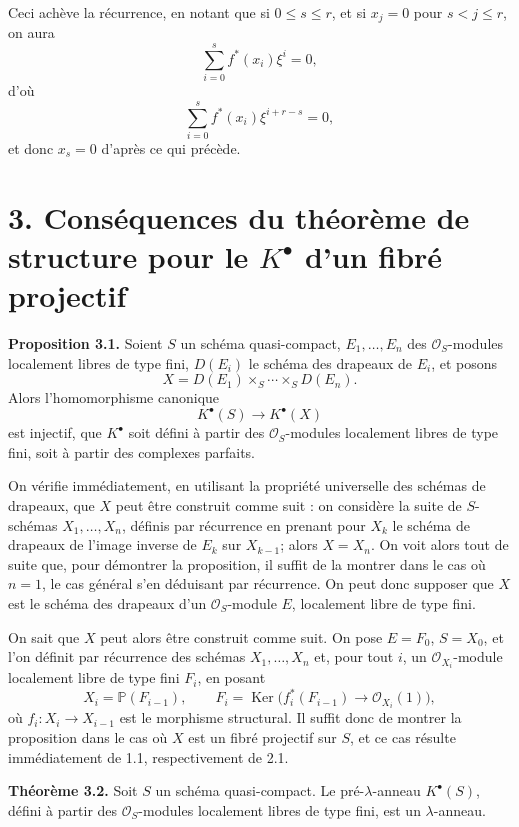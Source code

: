 \documentclass[11pt]{article}
\providecommand{\Ker}{\operatorname{Ker}}
\begin{document}
Ceci achève la récurrence, en notant que si \(0\le s\le r\), et si \(x_j=0\) pour \(s<j\le r\), on aura
\[
  \sum_{i=0}^{s} f^*(x_i)\xi^i=0,
\]
d'où
\[
  \sum_{i=0}^{s} f^*(x_i)\xi^{i+r-s}=0,
\]
et donc \(x_s=0\) d'après ce qui précède.

\section*{3. Conséquences du théorème de structure pour le \(K^\bullet\) d'un fibré projectif}

\textbf{Proposition 3.1.} Soient \(S\) un schéma quasi-compact, \(E_1,\ldots,E_n\) des \(\mathcal O_S\)-modules localement libres de type fini, \(D(E_i)\) le schéma des drapeaux de \(E_i\), et posons
\[
  X=D(E_1)\times_S\cdots\times_S D(E_n).
\]
Alors l'homomorphisme canonique
\[
  K^\bullet(S)\longrightarrow K^\bullet(X)
\]
est injectif, que \(K^\bullet\) soit défini à partir des \(\mathcal O_S\)-modules localement libres de type fini, soit à partir des complexes parfaits.

On vérifie immédiatement, en utilisant la propriété universelle des schémas de drapeaux, que \(X\) peut être construit comme suit : on considère la suite de \(S\)-schémas \(X_1,\ldots,X_n\), définis par récurrence en prenant pour \(X_k\) le schéma de drapeaux de l'image inverse de \(E_k\) sur \(X_{k-1}\); alors \(X=X_n\). On voit alors tout de suite que, pour démontrer la proposition, il suffit de la montrer dans le cas où \(n=1\), le cas général s'en déduisant par récurrence. On peut donc supposer que \(X\) est le schéma des drapeaux d'un \(\mathcal O_S\)-module \(E\), localement libre de type fini.

On sait que \(X\) peut alors être construit comme suit. On pose \(E=F_0\), \(S=X_0\), et l'on définit par récurrence des schémas \(X_1,\ldots,X_n\) et, pour tout \(i\), un \(\mathcal O_{X_i}\)-module localement libre de type fini \(F_i\), en posant
\[
  X_i=\mathbb P(F_{i-1}),\qquad
  F_i=\Ker\bigl(f_i^*(F_{i-1})\longrightarrow \mathcal O_{X_i}(1)\bigr),
\]
où \(f_i:X_i\to X_{i-1}\) est le morphisme structural. Il suffit donc de montrer la proposition dans le cas où \(X\) est un fibré projectif sur \(S\), et ce cas résulte immédiatement de 1.1, respectivement de 2.1.

\textbf{Théorème 3.2.} Soit \(S\) un schéma quasi-compact. Le pré-\(\lambda\)-anneau \(K^\bullet(S)\), défini à partir des \(\mathcal O_S\)-modules localement libres de type fini, est un \(\lambda\)-anneau.
\end{document}
